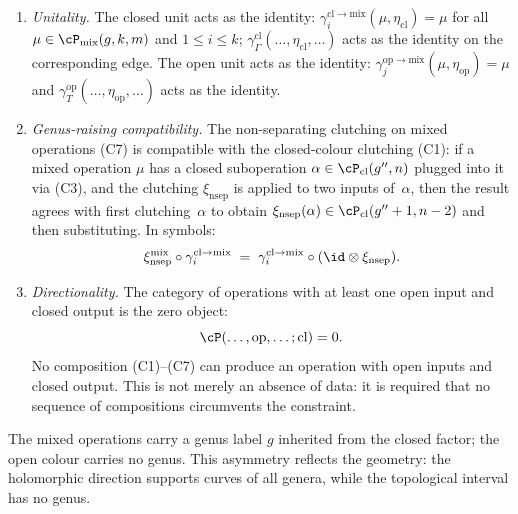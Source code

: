 \begin{definition}
\begin{enumerate}[label=\textup{(A\arabic*)}]
\item \emph{Unitality.}
 The closed unit acts as the identity:
 $\gamma_i^{\mathrm{cl} \to \mathrm{mix}}(\mu, \eta_{\mathrm{cl}})
 = \mu$ for all $\mu \in \cP_{\mathrm{mix}}(g,k,m)$ and
 $1 \le i \le k$;
 $\gamma_\Gamma^{\mathrm{cl}}(\ldots, \eta_{\mathrm{cl}}, \ldots)$
 acts as the identity on the corresponding edge.
 The open unit acts as the identity:
 $\gamma_j^{\mathrm{op} \to \mathrm{mix}}(\mu, \eta_{\mathrm{op}})
 = \mu$ and
 $\gamma_T^{\mathrm{op}}(\ldots, \eta_{\mathrm{op}}, \ldots)$
 acts as the identity.

\item \emph{Genus-raising compatibility.}
 The non-separating clutching on mixed operations (C7) is
 compatible with the closed-colour clutching (C1):
 if a mixed operation $\mu$ has a closed suboperation
 $\alpha \in \cP_{\mathrm{cl}}(g'', n)$
 plugged into it via (C3), and
 the clutching $\xi_{\mathrm{nsep}}$ is applied to two
 inputs of~$\alpha$, then the result agrees with first
 clutching~$\alpha$ to obtain
 $\xi_{\mathrm{nsep}}(\alpha) \in \cP_{\mathrm{cl}}(g''+1, n-2)$
 and then substituting. In symbols:
 \[
 \xi^{\mathrm{mix}}_{\mathrm{nsep}} \circ
 \gamma^{\mathrm{cl} \to \mathrm{mix}}_i
 \;=\;
 \gamma^{\mathrm{cl} \to \mathrm{mix}}_i \circ
 (\id \otimes \xi_{\mathrm{nsep}}).
 \]

\item \emph{Directionality.}
 The category of operations with at least one open input
 and closed output is the zero object:
 \[
 \cP(\ldots, \mathrm{op}, \ldots; \mathrm{cl}) = 0.
 \]
 No composition (C1)--(C7) can produce an operation with open
 inputs and closed output.
 This is not merely an absence of data: it is required that
 no sequence of compositions circumvents the constraint.
\end{enumerate}
The mixed operations carry a genus label $g$ inherited from the
closed factor; the open colour carries no genus. This asymmetry
reflects the geometry: the holomorphic direction supports curves of
all genera, while the topological interval has no genus.
\end{definition}

